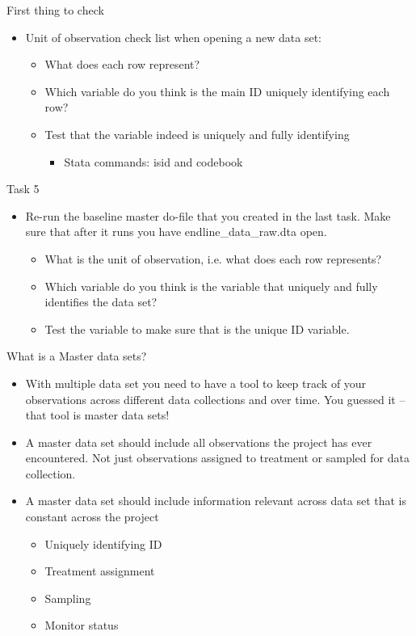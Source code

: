 \documentclass[aspectratio=169]{beamer}
\begin{document}
\begin{frame}{First thing to check}
\begin{itemize}
	\item Unit of observation check list when opening a new data set:
	\begin{itemize}
		\item What does each row represent?
		\item Which variable do you think is the main ID uniquely identifying each row?
		\item Test that the variable indeed is uniquely and fully identifying
			\begin{itemize}
				\item Stata commands: isid and codebook
			\end{itemize}		
	\end{itemize}
\end{itemize}
\end{frame}


\begin{frame}{Task 5}
\begin{itemize}
	\item Re-run the baseline master do-file that you created in the last task. Make sure that after it runs you have  endline\_data\_raw.dta open.
	\begin{itemize}
		\item What is the unit of observation, i.e. what does each row represents?		
		\item Which variable do you think is the variable that uniquely and fully identifies the data set?		
		\item Test the variable to make sure that is the unique ID variable.
	\end{itemize}
\end{itemize}
\end{frame}


\begin{frame}{What is a Master data sets?}
\begin{itemize}
	\item With multiple data set you need to have a tool to keep track of your observations across different data collections and over time. You guessed it – that tool is master data sets!
	\item A master data set should include all observations the project has ever encountered. Not just observations assigned to treatment or sampled for data collection.
	\item A master data set should include information relevant across data set that is constant across the project
	\begin{itemize}
		\item Uniquely identifying ID
		\item Treatment assignment
		\item Sampling
		\item Monitor status		
	\end{itemize}
\end{itemize}
\end{frame}
\end{document}
